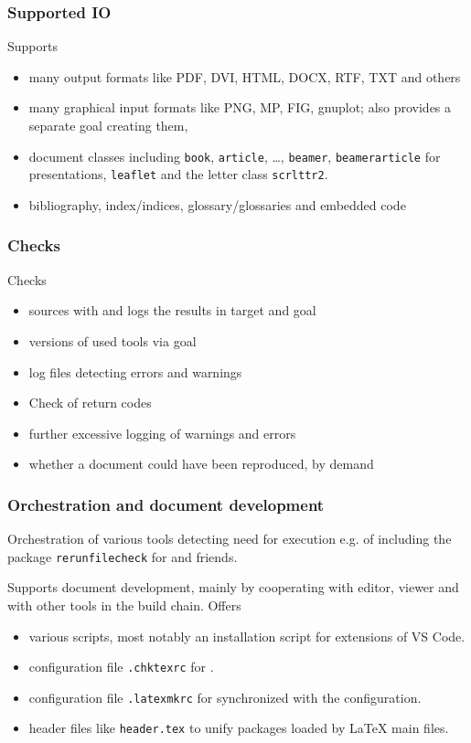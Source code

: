 \begin{frame}
  \frametitle{Supported IO}
  Supports 
  \begin{itemize}
    \item
    many output formats like PDF, DVI, HTML, DOCX, RTF, TXT and others
    \item
    many graphical input formats like PNG, MP, FIG, gnuplot; 
    also provides a separate goal creating them,  
    \item
    document classes including \texttt{book}, \texttt{article}, \dots, 
    \texttt{beamer}, \texttt{beamerarticle} for presentations, 
    \texttt{leaflet} and the letter class \texttt{scrlttr2}. 
    \item
    bibliography, index/indices, glossary/glossaries and embedded code 
  \end{itemize}
\end{frame}


\begin{frame}
  \frametitle{Checks}
  Checks 
  \begin{itemize}
    \item
    sources with  and logs the results in target and goal %
    \item
    versions of used tools via goal %
    \item
    log files detecting errors and warnings 
    \item
    Check of return codes 
    \item
    further excessive logging of warnings and errors 
    \item
    whether a document could have been reproduced, by demand 
  \end{itemize}
\end{frame}

\begin{frame}
  \frametitle{Orchestration and document development}
  Orchestration of various tools detecting need for execution e.g.
  of  including the package \texttt{rerunfilecheck} for  and friends.

  Supports document development, mainly by cooperating with editor, viewer and with other tools in the build chain. 
  Offers 
  \begin{itemize}
    \item various scripts, 
    most notably an installation script for extensions of VS Code.
    \item configuration file \texttt{.chktexrc} for .
    \item configuration file \texttt{.latexmkrc} for  
    synchronized with the configuration.
    \item header files like \texttt{header.tex} 
    to unify packages loaded by \LaTeX{} main files. %
  \end{itemize}
\end{frame}



